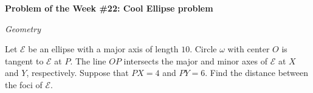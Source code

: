 \begin{potw}\vspace{5pt}
{\large\textbf{Problem of the Week \#22: Cool Ellipse problem}}\vspace{5pt}

\textit{Geometry}\V

Let $\mathcal{E}$ be an ellipse with a major axis of length $10$. Circle $\omega$ with center $O$ is tangent to $\mathcal{E}$ at $P$. The line $OP$ intersects the major and minor axes of $\mathcal{E}$ at $X$ and $Y$, respectively. Suppose that $PX=4$ and $PY=6$. Find the distance between the foci of $\mathcal{E}$.
\end{potw}\V
